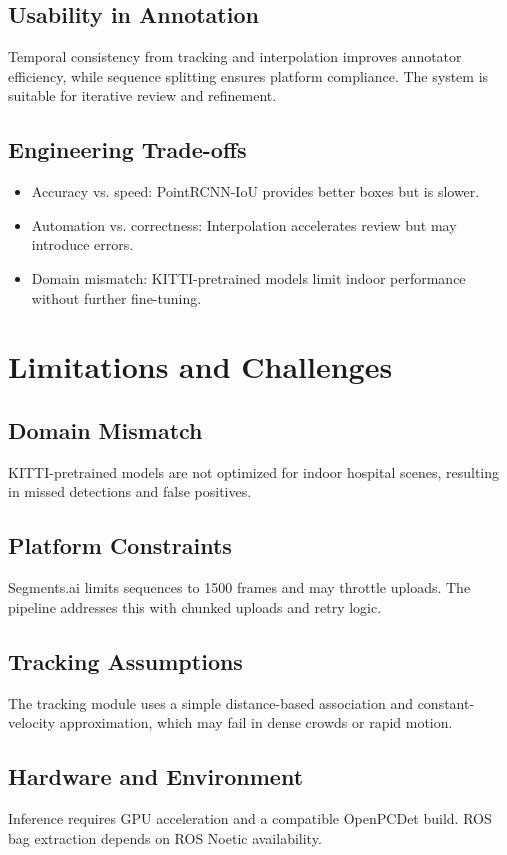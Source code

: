 \documentclass[a4paper,12pt]{report}
\begin{document}
\section{Usability in Annotation}
Temporal consistency from tracking and interpolation improves annotator efficiency, while sequence splitting ensures platform compliance. The system is suitable for iterative review and refinement.

\section{Engineering Trade-offs}
\begin{itemize}
\item Accuracy vs. speed: PointRCNN-IoU provides better boxes but is slower.
\item Automation vs. correctness: Interpolation accelerates review but may introduce errors.
\item Domain mismatch: KITTI-pretrained models limit indoor performance without further fine-tuning.
\end{itemize}

\chapter{Limitations and Challenges}
\section{Domain Mismatch}
KITTI-pretrained models are not optimized for indoor hospital scenes, resulting in missed detections and false positives.

\section{Platform Constraints}
Segments.ai limits sequences to 1500 frames and may throttle uploads. The pipeline addresses this with chunked uploads and retry logic.

\section{Tracking Assumptions}
The tracking module uses a simple distance-based association and constant-velocity approximation, which may fail in dense crowds or rapid motion.

\section{Hardware and Environment}
Inference requires GPU acceleration and a compatible OpenPCDet build. ROS bag extraction depends on ROS Noetic availability.
\end{document}
